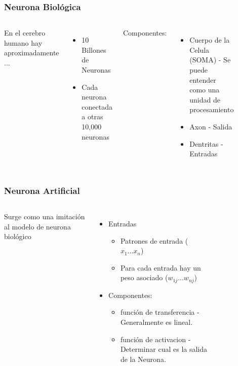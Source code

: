 

\frame
{
  \frametitle{Neurona Biológica}
  \begin{columns}
  En el cerebro humano hay aproximadamente ... %
  \begin{itemize}
  	\item 10 Billones de Neuronas  %
  	\item Cada neurona conectada a otras 10,000 neuronas %
  \end{itemize}
	Componentes: %
  \begin{itemize}
  	\item Cuerpo de la Celula (SOMA) - Se puede entender como una unidad de procesamiento %
  	\item Axon - Salida %
  	\item Dentritas - Entradas %
  \end{itemize}

	  \begin{center}	  	
		  \begin{figure}      
		  \end{figure}
		\end{center}  		
  \end{columns}
}



\frame
{
  \frametitle{Neurona Artificial}
  \begin{columns}
  Surge como una imitación al modelo de neurona biológico   %
  \begin{itemize}
  	\item Entradas %
		\begin{itemize}
  		\item Patrones de entrada ($x_1...x_n$) %
  		\item Para cada entrada hay un peso asociado ($w_{1j} ... w_{nj}$) %
  	\end{itemize}
  	\item Componentes: %
		\begin{itemize}
  		\item función de transferencia - Generalmente es lineal.  %
  		\item función de activacion - Determinar cual es la salida de la Neurona. %
  	\end{itemize}	  	
  \end{itemize}
	  \begin{center}	  	
		  \begin{figure}      
		  \end{figure}	
		\end{center}  
  \end{columns}
}


